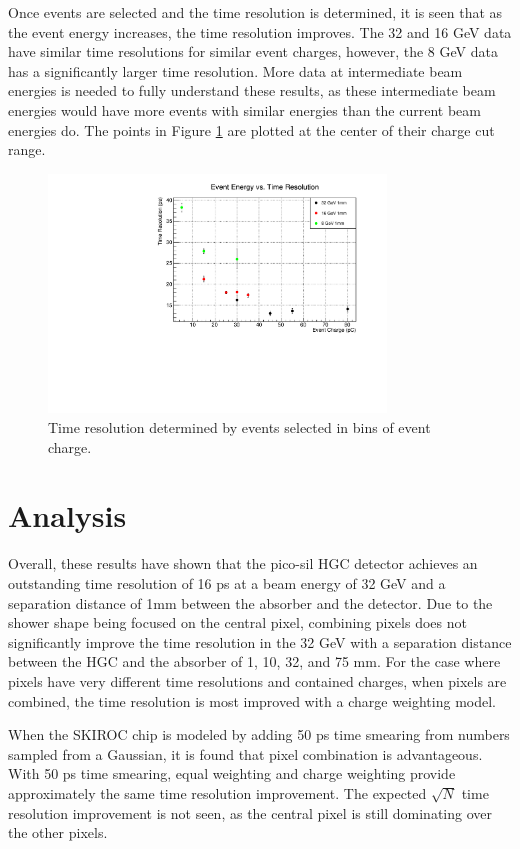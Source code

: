 \documentclass[twocolumn,aps,prd,reprint]{revtex4-1}
\begin{document}
Once events are selected and the time resolution is determined, it is seen that as the event energy increases, the time resolution improves. The 32 and 16 GeV data have similar time resolutions for similar event charges, however, the 8 GeV data has a significantly larger time resolution. More data at intermediate beam energies is needed to fully understand these results, as these intermediate beam energies would have more events with similar energies than the current beam energies do. The points in Figure \ref{time res event energy} are plotted at the center of their charge cut range.

\begin{figure}[!htbp]
\centering
\includegraphics[width = 0.8\textwidth]{time_res_event_energy}
\caption{Time resolution determined by events selected in bins of event charge.}
\label{time res event energy}
\end{figure}

\section{Analysis}

Overall, these results have shown that the pico-sil HGC detector achieves an outstanding time resolution of 16 ps at a beam energy of 32 GeV and a separation distance of 1mm between the absorber and the detector. Due to the shower shape being focused on the central pixel, combining pixels does not significantly improve the time resolution in the 32 GeV with a separation distance between the HGC and the absorber of 1, 10, 32, and 75 mm. For the case where pixels have very different time resolutions and contained charges, when pixels are combined, the time resolution is most improved with a charge weighting model.

When the SKIROC chip is modeled by adding 50 ps time smearing from numbers sampled from a Gaussian, it is found that pixel combination is advantageous. With 50 ps time smearing, equal weighting and charge weighting provide approximately the same time resolution improvement. The expected $\sqrt{N}$ time resolution improvement is not seen, as the central pixel is still dominating over the other pixels.
\end{document}

